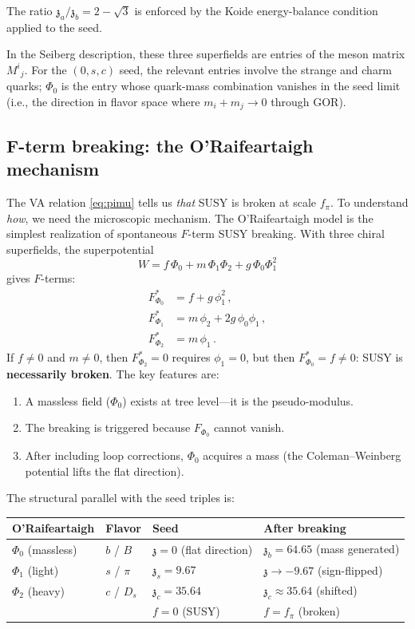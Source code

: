 \documentclass[12pt,a4paper]{article}
\newcommand{\zch}{\mathfrak{z}}
\begin{document}
The ratio $\zch_a/\zch_b = 2 - \sqrt{3}$ is enforced by the 
Koide energy-balance condition applied to the seed.

In the Seiberg description, these three superfields are entries of 
the meson matrix $M^i{}_j$. For the $(0, s, c)$ seed, the relevant 
entries involve the strange and charm quarks; $\Phi_0$ is the entry 
whose quark-mass combination vanishes in the seed limit (i.e., the 
direction in flavor space where $m_i + m_j \to 0$ through GOR).

\subsection{F-term breaking: the O'Raifeartaigh mechanism}
\label{subsec:fterm}

The VA relation \eqref{eq:pimu} tells us \emph{that} SUSY is broken at 
scale $f_\pi$. To understand \emph{how}, we need the microscopic 
mechanism. The O'Raifeartaigh model \cite{ORaifeartaigh} is the simplest 
realization of spontaneous $F$-term SUSY breaking. With three chiral 
superfields, the superpotential
\begin{equation}
W = f\,\Phi_0 + m\,\Phi_1\Phi_2 + g\,\Phi_0\Phi_1^2
\end{equation}
gives $F$-terms:
\begin{align}
F_{\Phi_0}^* &= f + g\,\phi_1^2\,, \\
F_{\Phi_1}^* &= m\,\phi_2 + 2g\,\phi_0\phi_1\,, \\
F_{\Phi_2}^* &= m\,\phi_1\,.
\end{align}
If $f \neq 0$ and $m \neq 0$, then $F_{\Phi_2}^* = 0$ requires 
$\phi_1 = 0$, but then $F_{\Phi_0}^* = f \neq 0$: SUSY is 
\textbf{necessarily broken}. The key features are:
\begin{enumerate}
\item A massless field ($\Phi_0$) exists at tree level---it is the 
pseudo-modulus.
\item The breaking is triggered because $F_{\Phi_0}$ cannot vanish.
\item After including loop corrections, $\Phi_0$ acquires a mass 
(the Coleman--Weinberg potential lifts the flat direction).
\end{enumerate}

The structural parallel with the seed triples is:

\begin{center}
\begin{tabular}{llll}
\toprule
O'Raifeartaigh & Flavor & Seed & After breaking \\
\midrule
$\Phi_0$ (massless) & $b$ / $B$ & $\zch = 0$ (flat direction) & $\zch_b = 64.65$ (mass generated) \\
$\Phi_1$ (light) & $s$ / $\pi$ & $\zch_s = 9.67$ & $\zch \to -9.67$ (sign-flipped) \\
$\Phi_2$ (heavy) & $c$ / $D_s$ & $\zch_c = 35.64$ & $\zch_c \approx 35.64$ (shifted) \\
\midrule
 & & $f = 0$ (SUSY) & $f = f_\pi$ (broken) \\
\bottomrule
\end{tabular}
\end{center}
\end{document}
